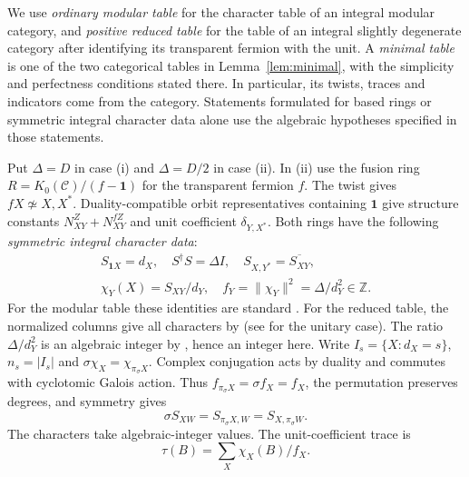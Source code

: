 \documentclass[11pt,a4paper]{article}
\numberwithin{equation}{section}
\theoremstyle{remark}
\newcommand{\C}{\mathcal C}
\newcommand{\one}{\mathbf1}
\newcommand{\ZZ}{\mathbb Z}
\begin{document}
We use \emph{ordinary modular table} for the character table of an integral
modular category, and \emph{positive reduced table} for the table of an
integral slightly degenerate category after identifying its transparent
fermion with the unit. A \emph{minimal table} is one of the two categorical
tables in Lemma~\ref{lem:minimal}, with the simplicity and perfectness
conditions stated there. In particular, its twists, traces and indicators
come from the category. Statements formulated for based rings or symmetric
integral character data alone use the algebraic hypotheses specified in
those statements.

Put $\Delta=D$ in case (i) and $\Delta=D/2$ in case (ii). In (ii) use the fusion ring $R=K_0(\C)/(f-\one)$ for the transparent fermion $f$. The twist gives $fX\not\simeq X,X^*$. Duality-compatible orbit representatives containing $\one$ give structure constants $N_{XY}^Z+N_{XY}^{fZ}$ and unit coefficient $\delta_{Y,X^*}$. Both rings have the following \emph{symmetric integral character data}:
\begin{equation}\label{eq:wgt-modular-data}
 \begin{gathered}S_{\one X}=d_X,\quad S^\dagger S=\Delta I,\quad S_{X,Y^*}=\overline{S_{XY}},\\
 \chi_Y(X)=S_{XY}/d_Y,\quad f_Y=\|\chi_Y\|^2=\Delta/d_Y^2\in\ZZ.\end{gathered}
\end{equation}
For the modular table these identities are standard \cite[Sections~8.13--8.14]{EGNO}. For the reduced table, the normalized columns give all characters by \cite[Proposition~3.3]{YuSlightlyDegenerate} (see \cite[Proposition~2.7]{BGNPWSuper} for the unitary case). The ratio $\Delta/d_Y^2$ is an algebraic integer by \cite[Corollary~3.4]{YuSlightlyDegenerate}, hence an integer here. Write $I_s=\{X:d_X=s\}$, $n_s=|I_s|$ and $\sigma\chi_X=\chi_{\pi_\sigma X}$. Complex conjugation acts by duality and commutes with cyclotomic Galois action. Thus $f_{\pi_\sigma X}=\sigma f_X=f_X$, the permutation preserves degrees, and symmetry gives
\begin{equation}\label{eq:galois-permutations}
 \sigma S_{XW}=S_{\pi_\sigma X,W}=S_{X,\pi_\sigma W}.
\end{equation}
The characters take algebraic-integer values. The unit-coefficient trace is
\begin{equation}\label{eq:fusion-coefficient-trace}
 \tau(B)=\sum_X\chi_X(B)/f_X .
\end{equation}
\end{document}
